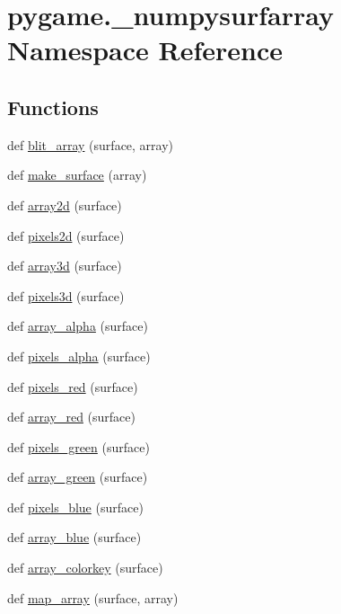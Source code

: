 \hypertarget{namespacepygame_1_1__numpysurfarray}{}\section{pygame.\+\_\+numpysurfarray Namespace Reference}
\label{namespacepygame_1_1__numpysurfarray}
\subsection*{Functions}
\begin{DoxyCompactItemize}
\item 
def \hyperlink{namespacepygame_1_1__numpysurfarray_ae2ebe8cbfe5560d24f9951ac1b0c0de0}{blit\+\_\+array} (surface, array)
\item 
def \hyperlink{namespacepygame_1_1__numpysurfarray_ade6efe65656cde78cfaff828f386e34c}{make\+\_\+surface} (array)
\item 
def \hyperlink{namespacepygame_1_1__numpysurfarray_a607b94c627bde5d92dad78c0598e4e16}{array2d} (surface)
\item 
def \hyperlink{namespacepygame_1_1__numpysurfarray_aa05d0ce24145776b0f0c87acbad2d1ff}{pixels2d} (surface)
\item 
def \hyperlink{namespacepygame_1_1__numpysurfarray_a386b3c0b773be2393e85debcd345e54e}{array3d} (surface)
\item 
def \hyperlink{namespacepygame_1_1__numpysurfarray_a317e54caca003290ff9e312bc9500b2a}{pixels3d} (surface)
\item 
def \hyperlink{namespacepygame_1_1__numpysurfarray_a3c85557facaa59435ab157a32dd6299a}{array\+\_\+alpha} (surface)
\item 
def \hyperlink{namespacepygame_1_1__numpysurfarray_a648f263161e021fa6f1fe4b2d2bd53f5}{pixels\+\_\+alpha} (surface)
\item 
def \hyperlink{namespacepygame_1_1__numpysurfarray_a5dc1c52039acb9e1734347069b3a8cce}{pixels\+\_\+red} (surface)
\item 
def \hyperlink{namespacepygame_1_1__numpysurfarray_a6ecb5f71f0bf8f5fd584c5a94ca2b418}{array\+\_\+red} (surface)
\item 
def \hyperlink{namespacepygame_1_1__numpysurfarray_a9e59718e0b42824bccf0827ff8c94469}{pixels\+\_\+green} (surface)
\item 
def \hyperlink{namespacepygame_1_1__numpysurfarray_aa3d72af99d6b9a7f2a1400b8aed22e20}{array\+\_\+green} (surface)
\item 
def \hyperlink{namespacepygame_1_1__numpysurfarray_a238bd95d18d3e5fb3efe3e09fdfa11c7}{pixels\+\_\+blue} (surface)
\item 
def \hyperlink{namespacepygame_1_1__numpysurfarray_ab76ee18e25cf0a3203c617ce6bc0f929}{array\+\_\+blue} (surface)
\item 
def \hyperlink{namespacepygame_1_1__numpysurfarray_adf2c05432071381051b0d4069fb53c53}{array\+\_\+colorkey} (surface)
\item 
def \hyperlink{namespacepygame_1_1__numpysurfarray_a04214dc9ffbf04b4192222c745873ec5}{map\+\_\+array} (surface, array)
\end{DoxyCompactItemize}
